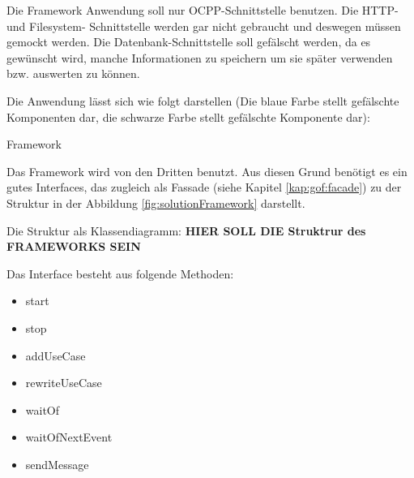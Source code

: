 Die Framework Anwendung soll nur OCPP-Schnittstelle benutzen. 
Die HTTP- und Filesystem- Schnittstelle werden gar nicht gebraucht und deswegen müssen gemockt werden.
Die Datenbank-Schnittstelle soll gefälscht werden, da es gewünscht wird, 
manche Informationen zu speichern um sie später verwenden bzw. auswerten zu können.

Die Anwendung lässt sich wie folgt darstellen 
(Die blaue Farbe stellt gefälschte Komponenten dar, die schwarze Farbe stellt gefälschte Komponente dar):

{Framework}

\newpage
Das Framework wird von den Dritten benutzt. Aus diesen Grund benötigt es ein gutes Interfaces, 
das zugleich als Fassade (siehe Kapitel \ref{kap:gof:facade}) zu der Struktur in der Abbildung \ref{fig:solutionFramework} darstellt.

Die Struktur als Klassendiagramm:
\textbf{HIER SOLL DIE Struktrur des FRAMEWORKS SEIN}

Das Interface besteht aus folgende Methoden:
\begin{itemize}
    \item start
    \item stop
    \item addUseCase
    \item rewriteUseCase
    \item waitOf
    \item waitOfNextEvent
    \item sendMessage
\end{itemize}